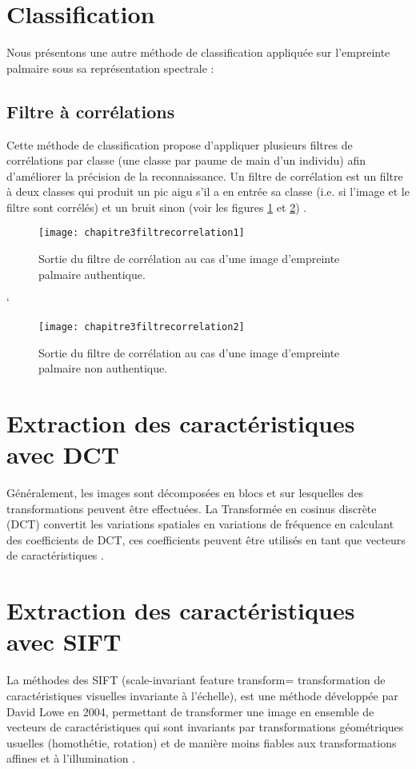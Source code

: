 \section{Classification}
Nous présentons une autre méthode de classification appliquée sur l'empreinte palmaire sous sa représentation spectrale :
\subsection{Filtre à corrélations}
\label{filterPalm}
Cette méthode de classification propose d’appliquer plusieurs filtres de corrélations par classe (une classe par paume de main d’un individu) afin d’améliorer la précision de la reconnaissance.
Un filtre de corrélation est un filtre à deux classes qui produit un pic aigu s’il a en entrée sa classe (i.e. si l’image et le filtre sont corrélés) et un bruit sinon (voir les figures \ref{fig:chapitre3filtrecorrelation1} et \ref{fig:chapitre3filtrecorrelation2}) \citep{hennings2007palmprint}.
\begin{center}
	\begin{figure}[H]
		\centering
		\texttt{[image: chapitre3filtrecorrelation1]}
		\caption{ Sortie du filtre de corrélation au cas d’une image d’empreinte palmaire authentique.}
		\label{fig:chapitre3filtrecorrelation1}
	\end{figure}
\end{center}
`\begin{center}
	\begin{figure}[H]
		\centering
		\texttt{[image: chapitre3filtrecorrelation2]}
		\caption{Sortie du filtre de corrélation au cas d’une image d’empreinte palmaire non authentique.}
		\label{fig:chapitre3filtrecorrelation2}
	\end{figure}
\end{center}
\section{Extraction des caractéristiques avec DCT}
\label{dct}
Généralement, les images sont décomposées en blocs et sur lesquelles des transformations peuvent être effectuées. La Transformée en cosinus discrète (DCT) convertit les variations spatiales en variations de fréquence en calculant des coefficients de DCT, ces coefficients peuvent être utilisés en tant que vecteurs de caractéristiques \citep{bai2013analyse}.
 \section{Extraction des caractéristiques avec SIFT}
 \label{sift}
 La méthodes des SIFT (scale-invariant feature transform= transformation de caractéristiques visuelles invariante à l'échelle), est une méthode développée par
David Lowe en 2004, permettant de transformer une image en ensemble de vecteurs de caractéristiques qui sont invariants par transformations géométriques usuelles (homothétie, rotation) et de manière moins fiables aux transformations affines et à l'illumination \citep{mikolajczyk2005performance}.
 